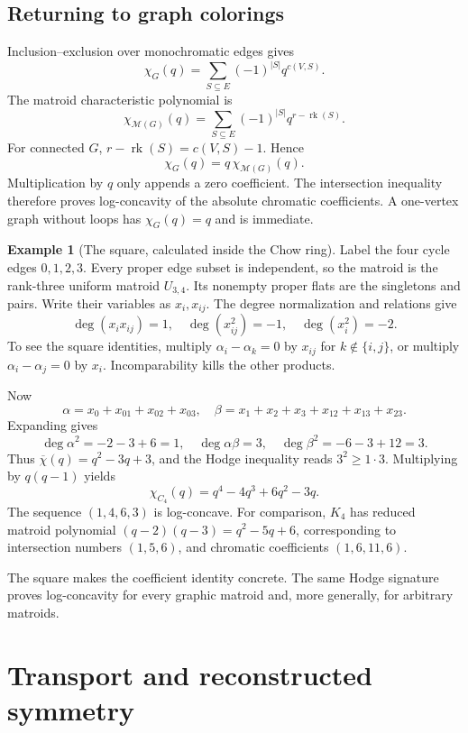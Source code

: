 \documentclass[11pt]{article}
\theoremstyle{definition}
\newtheorem{example}[theorem]{Example}
\theoremstyle{remark}
\begin{document}
\subsection{Returning to graph colorings}

Inclusion--exclusion over monochromatic edges gives
\[
 \chi_G(q)=\sum_{S\subseteq E}(-1)^{|S|}q^{c(V,S)}.
\]
The matroid characteristic polynomial is
\[
 \chi_{\mathcal M(G)}(q)=
 \sum_{S\subseteq E}(-1)^{|S|}q^{r-\operatorname{rk}(S)}.
\]
For connected $G$, $r-\operatorname{rk}(S)=c(V,S)-1$. Hence
\[
 \chi_G(q)=q\,\chi_{\mathcal M(G)}(q).
\]
Multiplication by $q$ only appends a zero coefficient. The intersection inequality therefore proves log-concavity of the absolute chromatic coefficients. A one-vertex graph without loops has $\chi_G(q)=q$ and is immediate.

\begin{example}[The square, calculated inside the Chow ring]\label{ex:gmh-c4}
Label the four cycle edges $0,1,2,3$. Every proper edge subset is independent, so the matroid is the rank-three uniform matroid $U_{3,4}$. Its nonempty proper flats are the singletons and pairs. Write their variables as $x_i,x_{ij}$. The degree normalization and relations give
\[
 \deg(x_ix_{ij})=1,
 \quad\deg(x_{ij}^2)=-1,
 \quad\deg(x_i^2)=-2.
\]
To see the square identities, multiply $\alpha_i-\alpha_k=0$ by $x_{ij}$ for $k\notin\{i,j\}$, or multiply $\alpha_i-\alpha_j=0$ by $x_i$. Incomparability kills the other products.

Now
\[
 \alpha=x_0+x_{01}+x_{02}+x_{03},
 \quad
 \beta=x_1+x_2+x_3+x_{12}+x_{13}+x_{23}.
\]
Expanding gives
\[
 \deg\alpha^2=-2-3+6=1,
 \quad\deg\alpha\beta=3,
 \quad\deg\beta^2=-6-3+12=3.
\]
Thus $\overline\chi(q)=q^2-3q+3$, and the Hodge inequality reads $3^2\ge1\cdot3$. Multiplying by $q(q-1)$ yields
\[
 \chi_{C_4}(q)=q^4-4q^3+6q^2-3q.
\]
The sequence $(1,4,6,3)$ is log-concave. For comparison, $K_4$ has reduced matroid polynomial $(q-2)(q-3)=q^2-5q+6$, corresponding to intersection numbers $(1,5,6)$, and chromatic coefficients $(1,6,11,6)$.
\end{example}

The square makes the coefficient identity concrete. The same Hodge signature proves log-concavity for every graphic matroid and, more generally, for arbitrary matroids.


\section{Transport and reconstructed symmetry}
\label{sec:transport}
\end{document}
